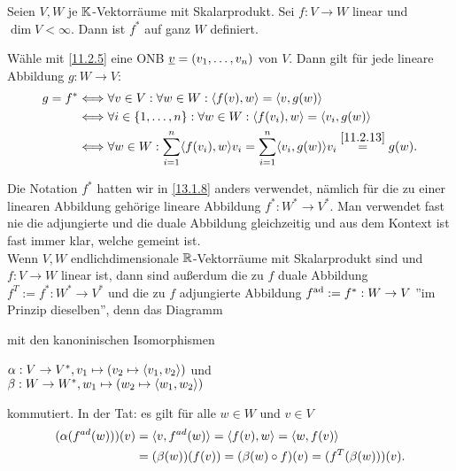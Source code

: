 \documentclass[../../main.tex]{subfiles}
\begin{document}
\begin{sat}\label{15.1.6}
Seien $V,W$ je $\mathbb K$-Vektorräume mit Skalarprodukt. Sei $f: V\to W$ linear und $\dim V<\infty$. Dann ist $f^*$ auf ganz $W$ definiert.
\end{sat}
\begin{cproof}
Wähle mit \ref{11.2.5} eine ONB ${\underline v}=(v_1,\ldots ,v_n)$ von $V$. Dann gilt für jede lineare Abbildung $g: W\to V$:
\begin{align*}
g=f^*&\Longleftrightarrow \forall v\in V: \forall w\in W: \langle f(v),w\rangle=\langle v,g(w)\rangle\\
&\Longleftrightarrow \forall i\in\{1,\ldots ,n\}: \forall w\in W: \langle f(v_i),w\rangle=\langle v_i, g(w)\rangle\\
&\Longleftrightarrow \forall w\in W: \sum_{i=1}^n \langle f(v_i),w\rangle v_i=\sum_{i=1}^n\langle v_i, g(w)\rangle v_i\stackrel{\ref{11.2.13}}{=}g(w).
\end{align*}
\end{cproof}
	
\begin{bem}\label{15.1.7}
Die Notation $f^*$ hatten wir in \ref{13.1.8} anders verwendet, nämlich für die zu einer linearen Abbildung gehörige lineare Abbildung $f^*: W^*\to V^*$. Man verwendet fast nie die adjungierte und die duale Abbildung gleichzeitig und aus dem Kontext ist fast immer klar, welche gemeint ist.\\
Wenn $V,W$ endlichdimensionale $\mathbb R$-Vektorräume mit Skalarprodukt sind und $f: V\to W$ linear ist, dann sind außerdum die zu $f$ duale Abbildung $f^T:=f^*: W^*\to V^*$ und die zu $f$ adjungierte Abbildung $f^{\operatorname{ad}}:=f^*: W\to V$ ''im Prinzip dieselben'', denn das Diagramm
\begin{center}
\end{center}
mit den kanoninischen Isomorphismen
\begin{center}
$\alpha: V\to V^*, v_1\mapsto(v_2\mapsto\langle v_1,v_2\rangle)$ und\\
$\beta: W\to W^*, w_1\mapsto(w_2\mapsto\langle w_1,w_2\rangle)$
\end{center}
kommutiert. In der Tat: es gilt für alle $w\in W$ und $v\in V$
\begin{align*}
(\alpha(f^{ad}(w)))(v)&=\langle v,f^{ad}(w)\rangle=\langle f(v),w\rangle=\langle w,f(v)\rangle\\
&=(\beta(w))(f(v))=(\beta(w)\circ f)(v)=(f^T(\beta(w)))(v).
\end{align*}
\end{bem}	
\end{document}
